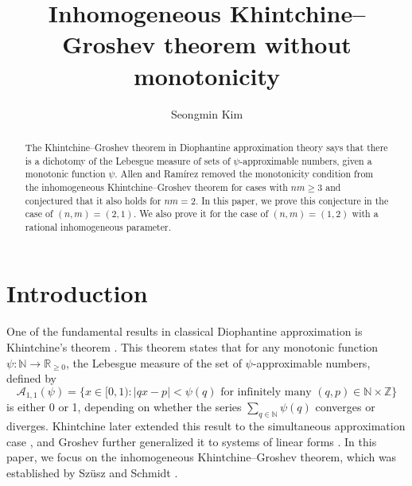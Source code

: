 \documentclass[reqno]{amsart}
\title{Inhomogeneous Khintchine--Groshev theorem without monotonicity}
\author{Seongmin Kim}
\theoremstyle{definition}
\theoremstyle{remark}
\begin{document}
\begin{abstract}
   The Khintchine--Groshev theorem in Diophantine approximation theory says that there is a dichotomy of the Lebesgue measure of sets of $\psi$-approximable numbers, given a monotonic function $\psi$. Allen and Ram\'irez removed the monotonicity condition from the inhomogeneous Khintchine--Groshev theorem for cases with $nm\geq3$ and conjectured that it also holds for $nm=2$. In this paper, we prove this conjecture in the case of $(n,m)=(2,1)$. We also prove it for the case of $(n,m)=(1,2)$ with a rational inhomogeneous parameter.
\end{abstract}


\maketitle


\section{Introduction}
One of the fundamental results in classical Diophantine approximation is Khintchine's theorem \cite{Khi24}. This theorem states that for any monotonic function $\psi: \mathbb{N} \to \mathbb{R}_{\geq 0}$, the Lebesgue measure of the set of $\psi$-approximable numbers, defined by
$$\mathscr{A}_{1,1}(\psi) = \{x \in [0,1) : |qx - p| < \psi(q) \text{ for infinitely many } (q,p) \in \mathbb{N} \times \mathbb{Z}\}$$
is either 0 or 1, depending on whether the series $\sum_{q\in \mathbb{N}} \psi(q)$ converges or diverges. Khintchine later extended this result to the simultaneous approximation case \cite{Khi26}, and Groshev further generalized it to systems of linear forms \cite{Gro38}. In this paper, we focus on the inhomogeneous Khintchine--Groshev theorem, which was established by Sz\"usz \cite{Szu58} and Schmidt \cite{Sch64}.
\end{document}
